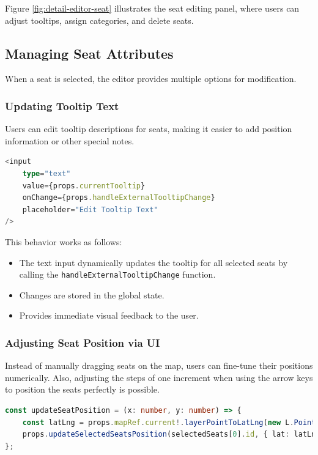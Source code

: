 Figure \ref{fig:detail-editor-seat} illustrates the seat editing panel, where users can adjust tooltips, assign categories, and delete seats.

\subsection{Managing Seat Attributes}
When a seat is selected, the editor provides multiple options for modification.

\subsubsection{Updating Tooltip Text}
Users can edit tooltip descriptions for seats, making it easier to add position information or other special notes.

\begin{lstlisting}[language=TypeScript, caption=Updating Tooltip for Selected Seats, label=lst:update-tooltip]
<input
    type="text"
    value={props.currentTooltip}
    onChange={props.handleExternalTooltipChange}
    placeholder="Edit Tooltip Text"
/>
\end{lstlisting}

This behavior works as follows:
\begin{itemize}
    \item The text input dynamically updates the tooltip for all selected seats by calling the \texttt{handleExternalTooltipChange} function.
    \item Changes are stored in the global state.
    \item Provides immediate visual feedback to the user.
\end{itemize}

\subsubsection{Adjusting Seat Position via UI}
Instead of manually dragging seats on the map, users can fine-tune their positions numerically. Also, adjusting the steps of one increment when using the arrow keys to position the seats perfectly is possible.

\begin{lstlisting}[language=TypeScript, caption=Updating Seat Coordinates, label=lst:update-seat-position]
const updateSeatPosition = (x: number, y: number) => {
    const latLng = props.mapRef.current!.layerPointToLatLng(new L.Point(x, y));
    props.updateSelectedSeatsPosition(selectedSeats[0].id, { lat: latLng.lat, lng: latLng.lng }, true);
};
\end{lstlisting}

